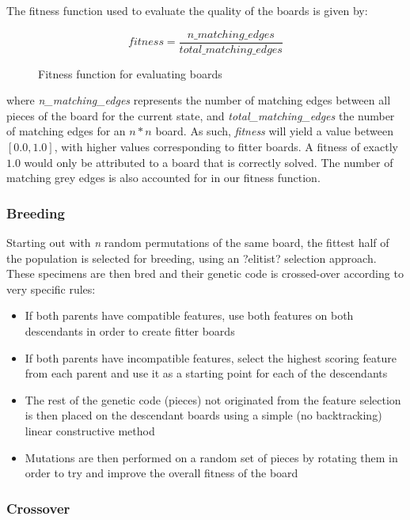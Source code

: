 \documentclass{llncs}
\begin{document}
The fitness function used to evaluate the quality of the boards is given by:

\begin{figure}[h]
	\begin{equation}
		fitness = \frac{n\_matching\_edges}{total\_matching\_edges}
	\end{equation}
	\caption{Fitness function for evaluating boards}
	\label{fig:eq:fitness_function}
\end{figure}

where \textit{n\_matching\_edges} represents the number of matching edges between all pieces of the board for the current state, and \textit{total\_matching\_edges} the number of matching edges for an $n*n$ board. As such, \textit{fitness} will yield a value between $[0.0, 1.0]$, with higher values corresponding to fitter boards. A fitness of exactly $1.0$ would only be attributed to a board that is correctly solved.
The number of matching grey edges is also accounted for in our fitness function.

\subsubsection{Breeding}
Starting out with \textit{n} random permutations of the same board, the fittest half of the population is selected for breeding, using an ?elitist? selection approach. These specimens are then bred and their genetic code is crossed-over according to very specific rules:

\begin{itemize}
	\item If both parents have compatible features, use both features on both descendants in order to create fitter boards
	\item If both parents have incompatible features, select the highest scoring feature from each parent and use it as a starting point for each of the descendants
	\item The rest of the genetic code (pieces) not originated from the feature selection is then placed on the descendant boards using a simple (no backtracking) linear constructive method
	\item Mutations are then performed on a random set of pieces by rotating them in order to try and improve the overall fitness of the board
\end{itemize}

\subsubsection{Crossover}\label{sec:crossover}
\end{document}
